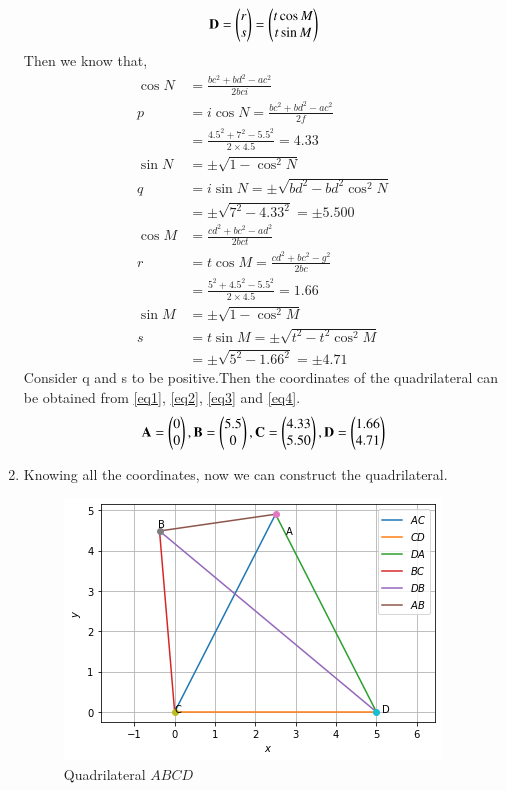 \documentclass[journal,12pt,twocolumn]{IEEEtran}
\begin{document}
\begin{enumerate}
\begin{equation}
    \mathbf{D}=\begin{pmatrix}r\\s\end{pmatrix}=\begin{pmatrix}t\cos M\\t\sin M\end{pmatrix} \label{eq4}
\end{equation}
Then we know that,
\begin{align}
  \cos N&=\frac{bc^2+bd^2-ac^2}{2bci}\\
    p&=i\cos N=\frac{bc^2+bd^2-ac^2}{2f}\\
    &=\frac{4.5^2+7^2-5.5^2}{2\times 4.5}=4.33\\
   \sin N&=\pm\sqrt{1-\cos^2 N}\\
   q&=i\sin N=\pm\sqrt{bd^2-bd^2\cos^2 N}\\
   &=\pm\sqrt{7^2-4.33^2}=\pm5.500\\
   \cos M&=\frac{cd^2+bc^2-ad^2}{2bct}\\
  r&= t\cos M=\frac{cd^2+bc^2-g^2}{2bc}\\
    &=\frac{5^2+4.5^2-5.5^2}{2\times 4.5}=1.66\\
     \sin M&=\pm\sqrt{1-\cos^2 M}\\
  s&= t\sin M=\pm\sqrt{t^2-t^2\cos^2 M}\\
   &=\pm\sqrt{5^2-1.66^2}=\pm4.71
\end{align}
Consider q and s to be positive.Then the coordinates of the quadrilateral can be obtained from \ref{eq1}, \ref{eq2}, \ref{eq3} and \ref{eq4}.
\begin{equation}
\mathbf{A}=\begin{pmatrix}0\\0\end{pmatrix},\mathbf{B}=\begin{pmatrix}5.5\\0\end{pmatrix},\mathbf{C}=\begin{pmatrix}4.33\\5.50\end{pmatrix},\mathbf{D}=\begin{pmatrix}1.66\\4.71\end{pmatrix}
\end{equation}
\item Knowing all the coordinates, now we can construct the quadrilateral.
\begin{figure}[!ht]
\centering
    \includegraphics[width= \columnwidth]{quad.png}
    \caption{Quadrilateral $ABCD$}
\end{figure}
\end{enumerate}
\end{document}
